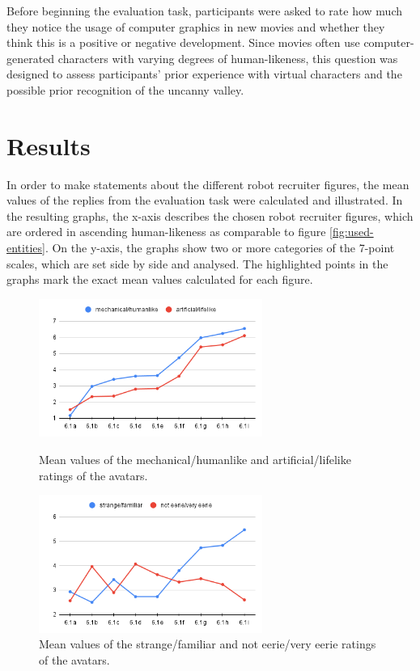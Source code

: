 Before beginning the evaluation task, participants were asked to rate how much they notice the usage of computer graphics in new movies and whether they think this is a positive or negative development. Since movies often use computer-generated characters with varying degrees of human-likeness, this question was designed to assess participants' prior experience with virtual characters and the possible prior recognition of the uncanny valley.


\section{Results}
In order to make statements about the different robot recruiter figures, the mean values of the replies from the evaluation task were calculated and illustrated. In the resulting graphs, the x-axis describes the chosen robot recruiter figures, which are ordered in ascending human-likeness as comparable to figure \ref{fig:used-entities}. On the y-axis, the graphs show two or more categories of the 7-point scales, which are set side by side and analysed. The highlighted points in the graphs mark the exact mean values calculated for each figure.\par
\begin{figure} %
    \centering
    \includegraphics[width=0.65\textwidth]{graphics/result/result1.png}
    \caption{Mean values of the mechanical/humanlike and artificial/lifelike ratings of the avatars.}
    \label{fig:humanlikeness}
    \vspace{20pt}
    \centering
    \includegraphics[width=0.65\textwidth]{graphics/result/result2.png}
    \caption{Mean values of the strange/familiar and not eerie/very eerie ratings of the avatars.}
    \label{fig:strangeness}
\end{figure}
